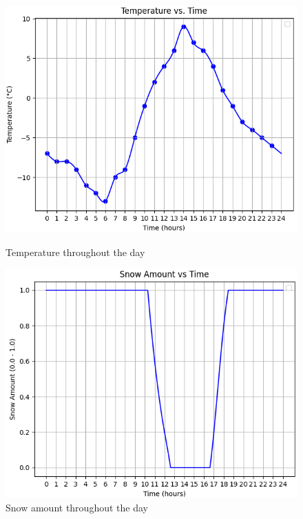 \documentclass{article}
\begin{document}

\begin{figure}[h]
  \centering
  \begin{minipage}{0.45\textwidth}
      \centering
      \includegraphics[width=\textwidth]{images/Temperature35N.png}
      \caption{Temperature throughout the day}
      \label{fig:Temperature35N}
  \end{minipage}\hfill
  \begin{minipage}{0.45\textwidth}
      \centering
      \includegraphics[width=\textwidth]{images/SnowAmount35N.png}
      \caption{Snow amount throughout the day}
      \label{fig:SnowAmount35N}
  \end{minipage}
\end{figure}
\end{document}
